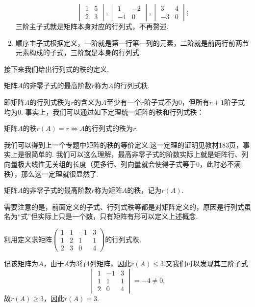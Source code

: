 \begin{solution}
\begin{enumerate}
        \[\begin{vmatrix}
            1 & 5 \\ 2 & 3
        \end{vmatrix},\begin{vmatrix}
            1 & -2 \\ -1 & 0
        \end{vmatrix},\begin{vmatrix}
            3 & 4 \\ -3 & 0
        \end{vmatrix};\]
        三阶主子式就是矩阵本身对应的行列式，不再赘述.
        \item 顺序主子式根据定义，一阶就是第一行第一列的元素，二阶就是前两行前两节元素构成的子式，三阶就是本身的行列式.
    \end{enumerate}
\end{solution}

接下来我们给出行列式的秩的定义.
\begin{definition}
    矩阵$A$的非零子式的最高阶数$r$称为$A$的行列式秩.
\end{definition}
即矩阵$A$的行列式秩为$r$的含义为$A$至少有一个$r$阶子式不为0，但所有$r+1$阶子式均为0. 事实上，我们可以通过如下定理统一矩阵的秩和行列式秩：
\begin{theorem}\label{thm:13:行列式秩等于行列式秩}
    矩阵$A$的秩$r(A)=r \iff A$的行列式的秩为$r$.
\end{theorem}
我们可以得到上一个专题中矩阵的秩的等价定义.这一定理的证明见教材183页，事实上是很简单的. 我们可以这么理解，最高非零子式的阶数实际上就是矩阵行、列向量极大线性无关组的长度（更多行、列向量就会使得子式等于0，此时必不满秩），那么这一定理就很显然了.

\begin{definition}
    矩阵$A$的非零子式的最高阶数$r$称为矩阵$A$的秩，记为$r(A)$.
\end{definition}

需要注意的是，前面定义的子式、行列式秩等都是对矩阵定义的，原因是行列式虽名为``式''但实际上只是一个数，只有矩阵有形可以定义上述概念.
\begin{example}
    利用定义求矩阵$\begin{pmatrix}
            1 & 1 & -1 & 3 \\ 1 & 2 & 1 & 1 \\ 2 & 3 & 0 & 4
        \end{pmatrix}$的行列式秩.
\end{example}

\begin{solution}
    记该矩阵为$A$，由于$A$为3行4列矩阵，因此$r(A)\leqslant 3$.又我们可以发现其三阶子式
    \[\begin{vmatrix}
        1 & -1 & 3 \\ 1 & 1 & 1 \\ 2 & 0 & 4
    \end{vmatrix}=-4\neq 0,\]
    故$r(A)\geqslant 3$，因此$r(A)=3$.
\end{solution}

